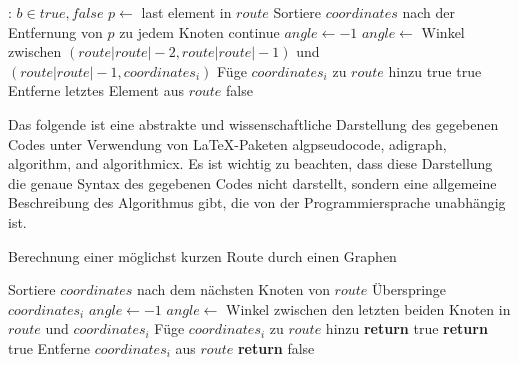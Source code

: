 \documentclass[a4paper,10pt,ngerman]{scrartcl}
\begin{document}
\begin{algorithmic}
: \Return $b \in {true,false}$
\State $p \gets$ last element in $route$
\State Sortiere $coordinates$ nach der Entfernung von $p$ zu jedem Knoten
\EndIf
{}
\State continue
\EndIf
\State $angle \gets -1$
\State $angle \gets$ Winkel zwischen $(route{|route|-2}, route{|route|-1})$ und $(route{|route|-1}, coordinates_i)$
\EndIf
{}
\State Füge $coordinates_i$ zu $route$ hinzu
\State \Return true
\EndIf
{}
\State \Return true
\Else
\State Entferne letztes Element aus $route$
\EndIf
\EndIf
\EndFor
\State \Return false
\EndFunction
\end{algorithmic}

Das folgende ist eine abstrakte und wissenschaftliche Darstellung des gegebenen Codes unter Verwendung von LaTeX-Paketen algpseudocode, adigraph, algorithm, and algorithmicx. Es ist wichtig zu beachten, dass diese Darstellung die genaue Syntax des gegebenen Codes nicht darstellt, sondern eine allgemeine Beschreibung des Algorithmus gibt, die von der Programmiersprache unabhängig ist.

\begin{algorithm}
\caption{Berechnung einer möglichst kurzen Route durch einen Graphen}
\begin{algorithmic}[1]
\State Sortiere $coordinates$ nach dem nächsten Knoten von $route$
\EndIf
{}
\State Überspringe $coordinates_i$
\EndIf
\State $angle \gets -1$
\State $angle \gets$ Winkel zwischen den letzten beiden Knoten in $route$ und $coordinates_i$
\EndIf
{}
\State Füge $coordinates_i$ zu $route$ hinzu
\State \textbf{return} true
\EndIf
{}
\State \textbf{return} true
\Else
\State Entferne $coordinates_i$ aus $route$
\EndIf
\EndIf
\EndFor
\State \textbf{return} false
\EndFunction
\end{algorithmic}
\end{algorithm}
\end{document}
